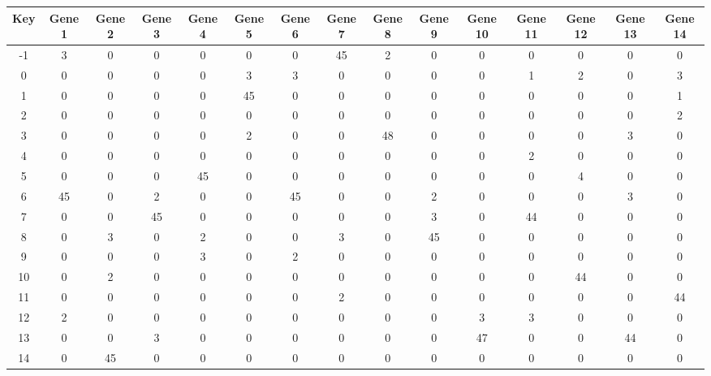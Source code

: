 \begin{tabular}{|c|c|c|c|c|c|c|c|c|c|c|c|c|c|c|}
\hline
Key & Gene 1 & Gene 2 & Gene 3 & Gene 4 & Gene 5 & Gene 6 & Gene 7 & Gene 8 & Gene 9 & Gene 10 & Gene 11 & Gene 12 & Gene 13 & Gene 14 \\
\hline
-1 & 3 & 0 & 0 & 0 & 0 & 0 & 45 & 2 & 0 & 0 & 0 & 0 & 0 & 0 \\
0 & 0 & 0 & 0 & 0 & 3 & 3 & 0 & 0 & 0 & 0 & 1 & 2 & 0 & 3 \\
1 & 0 & 0 & 0 & 0 & 45 & 0 & 0 & 0 & 0 & 0 & 0 & 0 & 0 & 1 \\
2 & 0 & 0 & 0 & 0 & 0 & 0 & 0 & 0 & 0 & 0 & 0 & 0 & 0 & 2 \\
3 & 0 & 0 & 0 & 0 & 2 & 0 & 0 & 48 & 0 & 0 & 0 & 0 & 3 & 0 \\
4 & 0 & 0 & 0 & 0 & 0 & 0 & 0 & 0 & 0 & 0 & 2 & 0 & 0 & 0 \\
5 & 0 & 0 & 0 & 45 & 0 & 0 & 0 & 0 & 0 & 0 & 0 & 4 & 0 & 0 \\
6 & 45 & 0 & 2 & 0 & 0 & 45 & 0 & 0 & 2 & 0 & 0 & 0 & 3 & 0 \\
7 & 0 & 0 & 45 & 0 & 0 & 0 & 0 & 0 & 3 & 0 & 44 & 0 & 0 & 0 \\
8 & 0 & 3 & 0 & 2 & 0 & 0 & 3 & 0 & 45 & 0 & 0 & 0 & 0 & 0 \\
9 & 0 & 0 & 0 & 3 & 0 & 2 & 0 & 0 & 0 & 0 & 0 & 0 & 0 & 0 \\
10 & 0 & 2 & 0 & 0 & 0 & 0 & 0 & 0 & 0 & 0 & 0 & 44 & 0 & 0 \\
11 & 0 & 0 & 0 & 0 & 0 & 0 & 2 & 0 & 0 & 0 & 0 & 0 & 0 & 44 \\
12 & 2 & 0 & 0 & 0 & 0 & 0 & 0 & 0 & 0 & 3 & 3 & 0 & 0 & 0 \\
13 & 0 & 0 & 3 & 0 & 0 & 0 & 0 & 0 & 0 & 47 & 0 & 0 & 44 & 0 \\
14 & 0 & 45 & 0 & 0 & 0 & 0 & 0 & 0 & 0 & 0 & 0 & 0 & 0 & 0 \\
\hline
\end{tabular}